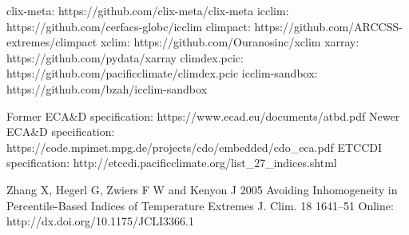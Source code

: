\documentclass[a4paper,11pt]{article}
\begin{document}
\begin{thebibliography}{10}
        clix-meta: https://github.com/clix-meta/clix-meta
        icclim: https://github.com/cerfacs-globc/icclim
        climpact: https://github.com/ARCCSS-extremes/climpact
        xclim: https://github.com/Ouranosinc/xclim
        xarray: https://github.com/pydata/xarray
        climdex.pcic: https://github.com/pacificclimate/climdex.pcic    
        icclim-sandbox: https://github.com/bzah/icclim-sandbox
        
        Former ECA\&D specification: https://www.ecad.eu/documents/atbd.pdf
        Newer ECA\&D specification: https://code.mpimet.mpg.de/projects/cdo/embedded/cdo\_eca.pdf
        ETCCDI specification: http://etccdi.pacificclimate.org/list\_27\_indices.shtml

        Zhang X, Hegerl G, Zwiers F W and Kenyon J 2005 Avoiding Inhomogeneity in Percentile-Based Indices of Temperature Extremes J. Clim. 18 1641–51 Online: http://dx.doi.org/10.1175/JCLI3366.1
\end{thebibliography}
\end{document}
